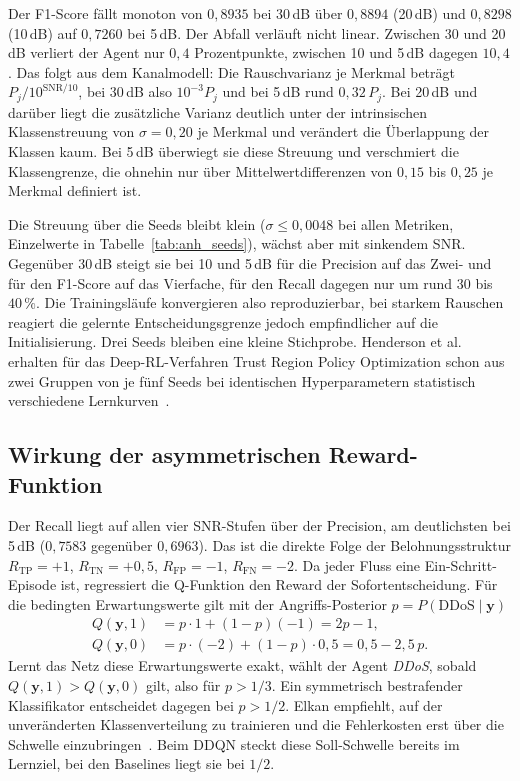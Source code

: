 Der F1-Score fällt monoton von $0{,}8935$ bei 30\,dB über $0{,}8894$ (20\,dB) und $0{,}8298$ (10\,dB) auf $0{,}7260$ bei 5\,dB. Der Abfall verläuft nicht linear. Zwischen 30 und 20\,dB verliert der Agent nur $0{,}4$ Prozentpunkte, zwischen 10 und 5\,dB dagegen $10{,}4$. Das folgt aus dem Kanalmodell: Die Rauschvarianz je Merkmal beträgt $P_j/10^{\mathrm{SNR}/10}$, bei 30\,dB also $10^{-3}P_j$ und bei 5\,dB rund $0{,}32\,P_j$. Bei 20\,dB und darüber liegt die zusätzliche Varianz deutlich unter der intrinsischen Klassenstreuung von $\sigma=0{,}20$ je Merkmal und verändert die Überlappung der Klassen kaum. Bei 5\,dB überwiegt sie diese Streuung und verschmiert die Klassengrenze, die ohnehin nur über Mittelwertdifferenzen von $0{,}15$ bis $0{,}25$ je Merkmal definiert ist.

Die Streuung über die Seeds bleibt klein ($\sigma\le 0{,}0048$ bei allen Metriken, Einzelwerte in Tabelle~\ref{tab:anh_seeds}), wächst aber mit sinkendem SNR. Gegenüber 30\,dB steigt sie bei 10 und 5\,dB für die Precision auf das Zwei- und für den F1-Score auf das Vierfache, für den Recall dagegen nur um rund $30$ bis $40\,\%$. Die Trainingsläufe konvergieren also reproduzierbar, bei starkem Rauschen reagiert die gelernte Entscheidungsgrenze jedoch empfindlicher auf die Initialisierung. Drei Seeds bleiben eine kleine Stichprobe. Henderson et al. erhalten für das Deep-RL-Verfahren Trust Region Policy Optimization schon aus zwei Gruppen von je fünf Seeds bei identischen Hyperparametern statistisch verschiedene Lernkurven~\autocite{hendersonDeepReinforcementLearning2018}.

\subsection{Wirkung der asymmetrischen Reward-Funktion}
\label{sec:reward_recall}

Der Recall liegt auf allen vier SNR-Stufen über der Precision, am deutlichsten bei 5\,dB ($0{,}7583$ gegenüber $0{,}6963$). Das ist die direkte Folge der Belohnungsstruktur $R_{\mathrm{TP}}=+1$, $R_{\mathrm{TN}}=+0{,}5$, $R_{\mathrm{FP}}=-1$, $R_{\mathrm{FN}}=-2$. Da jeder Fluss eine Ein-Schritt-Episode ist, regressiert die Q-Funktion den Reward der Sofortentscheidung. Für die bedingten Erwartungswerte gilt mit der Angriffs-Posterior $p=P(\text{DDoS}\mid\mathbf{y})$
\begin{align}
	Q(\mathbf{y},1)&=p\cdot 1+(1-p)(-1)=2p-1, \\
	Q(\mathbf{y},0)&=p\cdot(-2)+(1-p)\cdot 0{,}5=0{,}5-2{,}5\,p .
\end{align}
Lernt das Netz diese Erwartungswerte exakt, wählt der Agent \emph{DDoS}, sobald $Q(\mathbf{y},1)>Q(\mathbf{y},0)$ gilt, also für $p>1/3$. Ein symmetrisch bestrafender Klassifikator entscheidet dagegen bei $p>1/2$. Elkan empfiehlt, auf der unveränderten Klassenverteilung zu trainieren und die Fehlerkosten erst über die Schwelle einzubringen~\autocite{elkanFoundationsCostSensitiveLearning2001}. Beim DDQN steckt diese Soll-Schwelle bereits im Lernziel, bei den Baselines liegt sie bei $1/2$.

